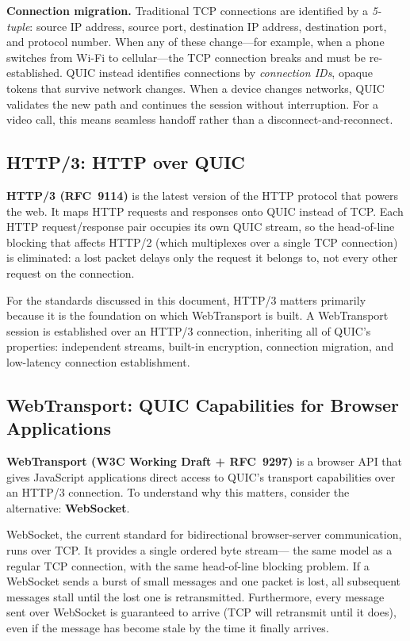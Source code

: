 \documentclass[11pt]{article}
\begin{document}
\textbf{Connection migration.}  Traditional TCP connections are identified
by a \emph{5-tuple}: source IP address, source port, destination IP address,
destination port, and protocol number.  When any of these change---for
example, when a phone switches from Wi-Fi to cellular---the TCP connection
breaks and must be re-established.  QUIC instead identifies connections by
\emph{connection IDs}, opaque tokens that survive network changes.  When a
device changes networks, QUIC validates the new path and continues the
session without interruption.  For a video call, this means seamless handoff
rather than a disconnect-and-reconnect.

\subsection{HTTP/3: HTTP over QUIC}

\textbf{HTTP/3 (RFC~9114)} is the latest version of the HTTP protocol that
powers the web.  It maps HTTP requests and responses onto QUIC instead of
TCP.  Each HTTP request/response pair occupies its own QUIC stream, so the
head-of-line blocking that affects HTTP/2 (which multiplexes over a single
TCP connection) is eliminated: a lost packet delays only the request it
belongs to, not every other request on the connection.

For the standards discussed in this document, HTTP/3 matters primarily
because it is the foundation on which WebTransport is built.  A
WebTransport session is established over an HTTP/3 connection, inheriting
all of QUIC's properties: independent streams, built-in encryption,
connection migration, and low-latency connection establishment.

\subsection{WebTransport: QUIC Capabilities for Browser Applications}

\textbf{WebTransport (W3C Working Draft + RFC~9297)} is a browser API that
gives JavaScript applications direct access to QUIC's transport capabilities
over an HTTP/3 connection.  To understand why this matters, consider the
alternative: \textbf{WebSocket}.

WebSocket, the current standard for bidirectional browser-server
communication, runs over TCP.  It provides a single ordered byte stream---
the same model as a regular TCP connection, with the same head-of-line
blocking problem.  If a WebSocket sends a burst of small messages and one
packet is lost, all subsequent messages stall until the lost one is
retransmitted.  Furthermore, every message sent over WebSocket is guaranteed
to arrive (TCP will retransmit until it does), even if the message has become
stale by the time it finally arrives.
\end{document}
